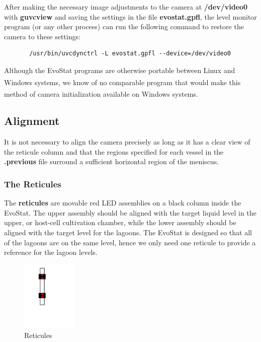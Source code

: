 \documentclass[10pt,letterpaper]{article}
\begin{document}
After making the necessary image adjustments to the camera at {\bf /dev/video0} with {\bf guvcview} and saving the settings in the file {\bf evostat.gpfl}, the level monitor program (or any other process) can run the following command to restore the camera to these settings:
\begin{verbatim}
       /usr/bin/uvcdynctrl -L evostat.gpfl --device=/dev/video0
\end{verbatim}

Although the EvoStat programs are otherwise portable between Linux and
Windows\textsuperscript{\textregistered}
systems, we know of no comparable program that would make this method
of camera initialization available on
Windows\textsuperscript{\textregistered}
systems.

\subsection*{Alignment}
It is not necessary to align the camera precisely as long as it has a clear view of the reticule column and that the regions specified for each vessel in the {\bf .previous} file surround a sufficient horizontal region of the meniscus.

\subsubsection*{The Reticules}
The {\bf reticules} are movable red LED assemblies on a black column inside the EvoStat. The upper assembly should be aligned with the target liquid level in the upper, or host-cell cultivation chamber, while the lower assembly should be aligned with the target level for the lagoons.  The EvoStat is designed so that all of the lagoons are on the same level, hence we only need one reticule to provide a reference for the lagoon levels.

\begin{figure}
\centering
\includegraphics[width=0.23\textwidth,scale=0.2]{reticules.png}
\caption{\label{fig:reticules}Reticules}
\end{figure}
\end{document}
